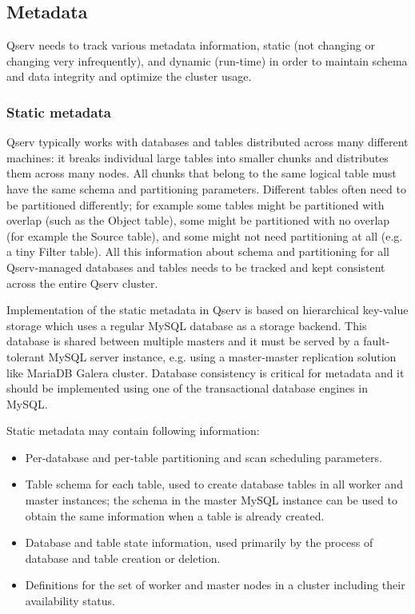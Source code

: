 \documentclass[DM,toc]{lsstdoc}
\begin{document}
\subsection{Metadata}\label{metadata}

Qserv needs to track various metadata information, static (not changing
or changing very infrequently), and dynamic (run-time) in order to
maintain schema and data integrity and optimize the cluster usage.

\subsubsection{Static metadata}\label{static-metadata}

Qserv typically works with databases and tables distributed across many
different machines: it breaks individual large tables into smaller chunks and
distributes them across many nodes. All chunks that belong to the same logical
table must have the same schema and partitioning parameters. Different tables
often need to be partitioned differently; for example some tables might be
partitioned with overlap (such as the Object table), some might be partitioned
with no overlap (for example the Source table), and some might not need
partitioning at all (e.g. a tiny Filter table). All this information about
schema and partitioning for all Qserv-managed databases and tables needs to be
tracked and kept consistent across the entire Qserv cluster.

Implementation of the static metadata in Qserv is based on hierarchical
key-value storage which uses a regular MySQL database as a storage
backend. This database is shared between multiple masters and it must be
served by a fault-tolerant MySQL server instance, e.g. using a
master-master replication solution like MariaDB Galera cluster. Database
consistency is critical for metadata and it should be implemented using
one of the transactional database engines in MySQL.

Static metadata may contain following information:

\begin{itemize}
\item
  Per-database and per-table partitioning and scan scheduling
  parameters.
\item
  Table schema for each table, used to create database tables in all
  worker and master instances; the schema in the master MySQL instance
  can be used to obtain the same information when a table is already
  created.
\item
  Database and table state information, used primarily by the process of
  database and table creation or deletion.
\item
  Definitions for the set of worker and master nodes in a cluster
  including their availability status.
\end{itemize}
\end{document}
